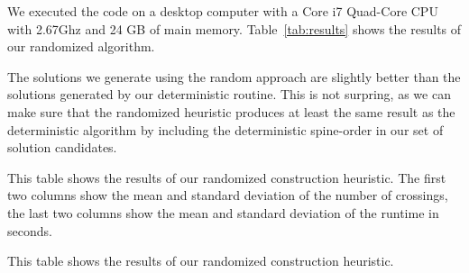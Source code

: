 \documentclass{scrartcl}
\begin{document}
We executed the code on a desktop computer with a Core i7 Quad-Core
CPU with 2.67Ghz and 24 GB of main memory. Table~\ref{tab:results}
shows the results of our randomized algorithm.

The solutions we generate using the random approach are slightly
better than the solutions generated by our deterministic routine. This
is not surpring, as we can make sure that the randomized heuristic
produces at least the same result as the deterministic algorithm by
including the deterministic spine-order in our set of solution
candidates.


\begin{table}[h]

\centering

\caption{This table shows the results of our randomized construction
  heuristic. The first two columns show the mean and standard
  deviation of the number of crossings, the last two columns show the
  mean and standard deviation of the runtime in seconds.}
\caption{This table shows the results of our randomized construction heuristic.}

\label{tab:results}
\end{table}
\end{document}

